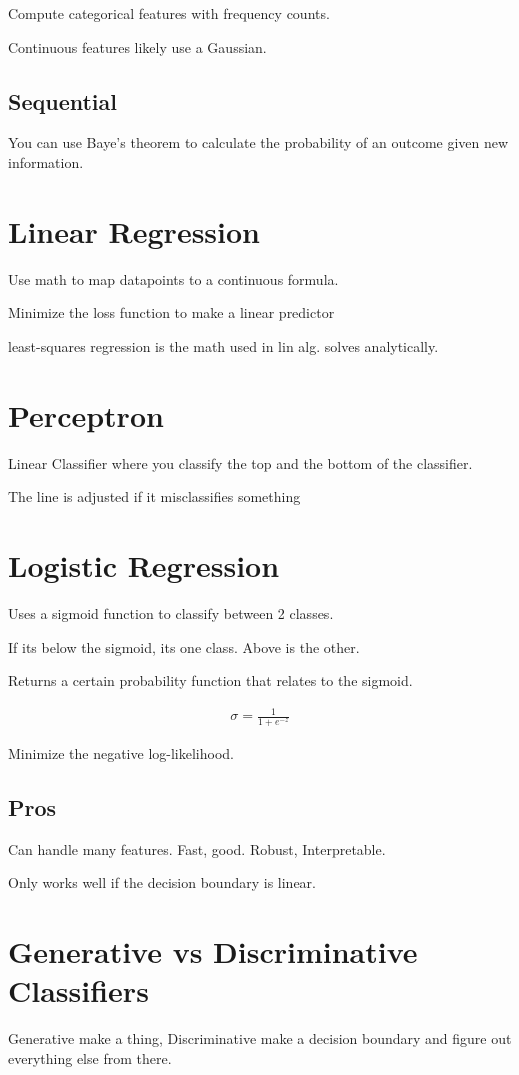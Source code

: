 \documentclass[fleqn]{report}
\newcommand{\equations} [1] {
\begin{gather*}
#1
\end{gather*}
}
\begin{document}
Compute categorical features with frequency counts.

Continuous features likely use a Gaussian.

\subsection{Sequential}
You can use Baye's theorem to 
calculate the probability of an outcome given new information. 

\section{Linear Regression}
Use math to map datapoints to a continuous formula. 

Minimize the loss function to make a linear predictor 

least-squares regression is the math used in lin alg. solves analytically. 

\section{Perceptron}
Linear Classifier where you classify the top and the bottom of the classifier. 

The line is adjusted if it misclassifies something

\section{Logistic Regression}
Uses a sigmoid function to classify between 2 classes. 

If its below the sigmoid, its one class. Above is the other. 

Returns a certain probability function that relates to the sigmoid. 

\equations{
    \sigma     
    =
    \frac{1}{1 + e^{-z}}
}

Minimize the negative log-likelihood.

\subsection{Pros}
Can handle many features. Fast, good. Robust, Interpretable. 

Only works well if the decision boundary is linear. 

\section{Generative vs Discriminative Classifiers}
Generative make a thing, Discriminative make a decision boundary and figure 
out everything else from there. 
\end{document}
